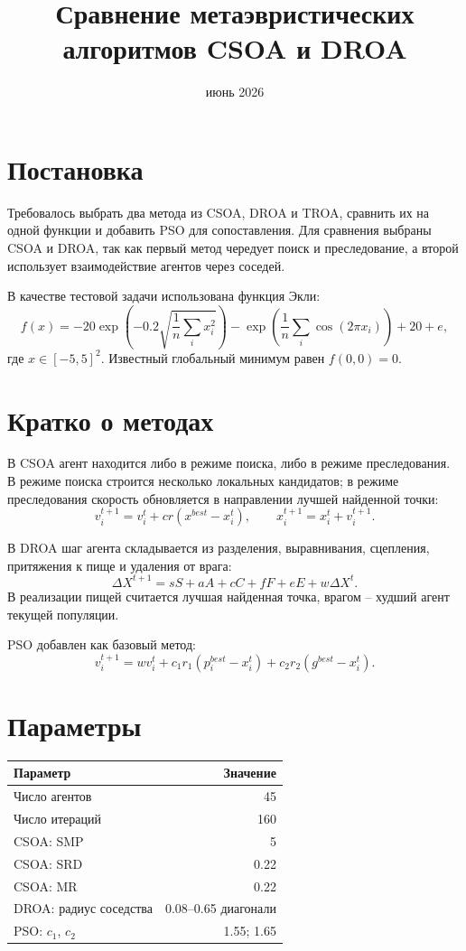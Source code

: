 \documentclass[12pt,a4paper]{article}
\title{Сравнение метаэвристических алгоритмов CSOA и DROA}
\author{}
\date{июнь 2026}
\begin{document}
\maketitle

\section*{Постановка}
Требовалось выбрать два метода из CSOA, DROA и TROA, сравнить их на одной функции и добавить PSO для сопоставления. Для сравнения выбраны CSOA и DROA, так как первый метод чередует поиск и преследование, а второй использует взаимодействие агентов через соседей.

В качестве тестовой задачи использована функция Экли:
\[
f(x)=-20\exp\left(-0.2\sqrt{\frac{1}{n}\sum_i x_i^2}\right)
-\exp\left(\frac{1}{n}\sum_i \cos(2\pi x_i)\right)+20+e,
\]
где $x\in[-5,5]^2$. Известный глобальный минимум равен $f(0,0)=0$.

\section*{Кратко о методах}
В CSOA агент находится либо в режиме поиска, либо в режиме преследования. В режиме поиска строится несколько локальных кандидатов; в режиме преследования скорость обновляется в направлении лучшей найденной точки:
\[
v_i^{t+1} = v_i^t + c r (x^{best} - x_i^t), \qquad x_i^{t+1}=x_i^t+v_i^{t+1}.
\]

В DROA шаг агента складывается из разделения, выравнивания, сцепления, притяжения к пище и удаления от врага:
\[
\Delta X^{t+1} = sS+aA+cC+fF+eE+w\Delta X^t.
\]
В реализации пищей считается лучшая найденная точка, врагом -- худший агент текущей популяции.

PSO добавлен как базовый метод:
\[
v_i^{t+1} = wv_i^t+c_1r_1(p_i^{best}-x_i^t)+c_2r_2(g^{best}-x_i^t).
\]

\section*{Параметры}
\begin{center}
\begin{tabular}{lr}
\toprule
Параметр & Значение \\
\midrule
Число агентов & 45 \\
Число итераций & 160 \\
CSOA: SMP & 5 \\
CSOA: SRD & 0.22 \\
CSOA: MR & 0.22 \\
DROA: радиус соседства & 0.08--0.65 диагонали \\
PSO: $c_1$, $c_2$ & 1.55; 1.65 \\
\bottomrule
\end{tabular}
\end{center}
\end{document}
